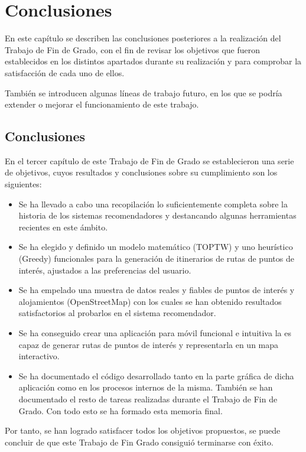 \chapter{Conclusiones}

En este capítulo se describen las conclusiones posteriores a la realización del Trabajo de Fin de Grado, con el fin de revisar los objetivos que fueron establecidos en los distintos apartados durante su realización y para comprobar la satisfacción de cada uno de ellos.\newline

También se introducen algunas líneas de trabajo futuro, en los que se podría extender o mejorar el funcionamiento de este trabajo.\newline

\section[Conclusiones]{Conclusiones}
En el tercer capítulo de este Trabajo de Fin de Grado se establecieron una serie de objetivos, cuyos resultados y conclusiones sobre su cumplimiento son los siguientes:
\begin{itemize}
	\item Se ha llevado a cabo una recopilación lo suficientemente completa sobre la historia de los sistemas recomendadores y destancando algunas herramientas recientes en este ámbito.
	\item Se ha elegido y definido un modelo matemático (TOPTW) y uno heurístico (Greedy) funcionales para la generación de itinerarios de rutas de puntos de interés, ajustados a las preferencias del usuario.
	\item Se ha empelado una muestra de datos reales y fiables de puntos de interés y alojamientos (OpenStreetMap) con los cuales se han obtenido resultados satisfactorios al probarlos en el sistema recomendador.
	\item Se ha conseguido crear una aplicación para móvil funcional e intuitiva la es capaz de generar rutas de puntos de interés y representarla en un mapa interactivo.
	\item Se ha documentado el código desarrollado tanto en la parte gráfica de dicha aplicación como en los procesos internos de la misma. También se han documentado el resto de tareas realizadas durante el Trabajo de Fin de Grado. Con todo esto se ha formado esta memoria final.
\end{itemize}

Por tanto, se han logrado satisfacer todos los objetivos propuestos, se puede concluir de que este Trabajo de Fin Grado consiguió terminarse con éxito.\newline

